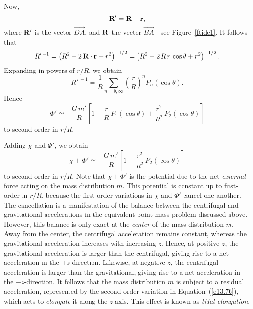Now, 
\begin{equation}
{\bf R}' = {\bf R} - {\bf r},
\end{equation}
where ${\bf R}'$ is the vector $\stackrel{\displaystyle \rightarrow}{DA}$,
and ${\bf R}$ the vector  $\stackrel{\displaystyle \rightarrow}{BA}$---see Figure~\ref{ftide1}.
It follows that
\begin{equation}
R'^{\,-1} = \left(R^2 - 2\,{\bf R}\cdot{\bf r}+ r^2\right)^{-1/2}
=  \left(R^2 - 2\,R\,r\,\cos\theta+ r^2\right)^{-1/2}.
\end{equation}
Expanding in powers of $r/R$, we obtain
\begin{equation}
R'^{\,-1} = \frac{1}{R}\sum_{n=0,\infty} \left(\frac{r}{R}\right)^n P_n(\cos\theta).
\end{equation}
Hence, 
\begin{equation}
\Phi' \simeq - \frac{G\,m'}{R}\left[1+ \frac{r}{R}\,P_1(\cos\theta) + \frac{r^2}{R^2}\,P_2(\cos\theta)\right]
\end{equation}
 to second-order in $r/R$. 

Adding $\chi$ and $\Phi'$, we obtain
\begin{equation}\label{e13.76}
\chi+\Phi' \simeq - \frac{G\,m'}{R}\left[1 + \frac{r^2}{R^2}\,P_2(\cos\theta)\right]
\end{equation}
 to second-order in $r/R$. Note that $\chi+\Phi'$ is the potential
due to the net {\em external}\/ force acting on the mass distribution $m$. This
potential is constant up to first-order in $r/R$, because the first-order
variations in $\chi$ and $\Phi'$ cancel one another. The
cancellation
is a manifestation of the balance between the centrifugal and gravitational
accelerations in the equivalent point mass problem discussed above. However, this balance
is only exact at the {\em center}\/ of the mass distribution $m$. Away from the
center, the centrifugal acceleration remains constant, whereas
the gravitational acceleration increases with increasing $z$. Hence, at positive $z$, the gravitational
acceleration is larger than the centrifugal, giving rise to a net acceleration
in the $+z$-direction. Likewise, at negative $z$, the centrifugal acceleration
is larger than the gravitational, giving rise to a net acceleration in the $-z$-direction.
It follows that the mass distribution $m$
is subject to a residual acceleration, represented by the second-order variation in Equation~(\ref{e13.76}), which acts to {\em elongate}\/ it along the $z$-axis. 
This effect is known as {\em tidal elongation}.

